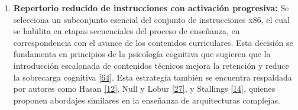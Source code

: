 \documentclass[12pt,oneside]{templates/unerthesis}
\providecommand{\tightlist}{%
  \setlength{\itemsep}{0pt}\setlength{\parskip}{0pt}}
\begin{document}
\begin{enumerate}
\def\labelenumi{\arabic{enumi}.}
\setcounter{enumi}{2}
\tightlist
\item
  \textbf{Repertorio reducido de instrucciones con activación progresiva:}
  Se selecciona un subconjunto esencial del conjunto de instrucciones x86, el cual se habilita en etapas secuenciales del proceso de enseñanza, en correspondencia con el avance de los contenidos curriculares. Esta decisión se fundamenta en principios de la psicología cognitiva que sugieren que la introducción escalonada de contenidos técnicos mejora la retención y reduce la sobrecarga cognitiva \protect\hyperlink{ref-nationalacademies2018how}{{[}64{]}}. Esta estrategia también se encuentra respaldada por autores como Hasan \protect\hyperlink{ref-hasan_survey_2012}{{[}12{]}}, Null y Lobur \protect\hyperlink{ref-null_essentials_2023}{{[}27{]}}, y Stallings \protect\hyperlink{ref-stallings_computer_2021}{{[}14{]}}, quienes proponen abordajes similares en la enseñanza de arquitecturas complejas.
\end{enumerate}

\begin{table}[!h]
\centering
\caption{\label{tab:activacionprogresiva}Activación progresiva del repertorio de instrucciones}
\centering
{}
\end{table}
\end{document}
